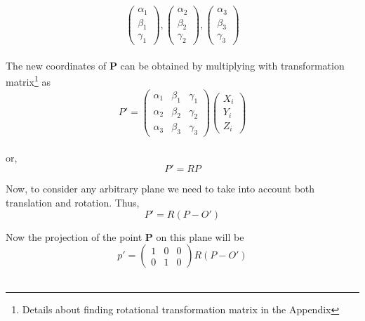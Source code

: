 \documentclass[a4paper,11pt,openany]{book}
\begin{document}
\begin{equation}
\left(\begin{array}{c} \alpha_1 \\ \beta_1 \\ \gamma_1\end{array}\right),\left(\begin{array}{c} \alpha_2 \\ \beta_2 \\ \gamma_2\end{array}\right),
\left(\begin{array}{c} \alpha_3 \\ \beta_3 \\ \gamma_3\end{array}\right)
\end{equation}\\

The new coordinates of $\boldsymbol{P}$ can be obtained by multiplying with transformation matrix\footnote{Details about finding rotational transformation matrix in the Appendix} as
\begin{equation}
P' =
\left(\begin{array}{ccc} \alpha_1 & \beta_1 & \gamma_1 \\ \alpha_2 & \beta_2 & \gamma_2 \\ \alpha_3 & \beta_3 & \gamma_3 \end{array}\right) \left(\begin{array}{c} X_i \\ Y_i \\ Z_i\end{array}\right)
\end{equation}\\
or,
\begin{equation}
P' = RP
\end{equation}

Now, to consider any arbitrary plane we need to take into account both translation and rotation. Thus,
\begin{equation}
P' = R(P-O')
\end{equation}

Now the projection of the point $\boldsymbol{P}$ on this plane will be 
\begin{equation}
p' = \left(\begin{array}{ccc} 1 & 0 & 0 \\ 0 & 1 & 0 \end{array}\right)R(P-O')
\end{equation}\\
\end{document}

